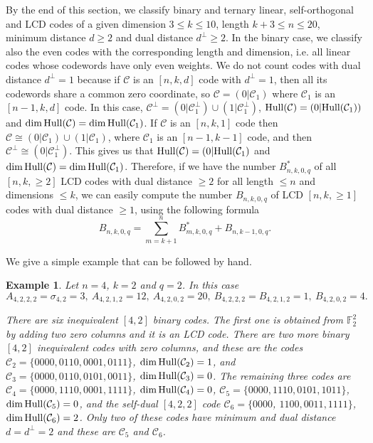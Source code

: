 \documentclass[a4paper,11pt]{article}
\newtheorem{example}{Example}
\newcommand{\F}{\mathbb{F}}
\newcommand{\hull}{\mbox{\rm Hull}}
\begin{document}
By the end of this section, we classify binary and ternary linear, self-orthogonal and LCD codes of a given dimension $3\le k\le 10$, length $k+3\le n\le 20$, minimum distance $d\ge 2$ and dual distance $d^\perp\ge 2$.
 In the binary case, we classify also the even codes with the corresponding length and dimension, i.e. all linear codes whose codewords have only even weights. We do not count codes with dual distance $d^\perp=1$ because if $\mathcal{C}$ is an $[n,k,d]$ code with $d^\perp=1$, then all its codewords share a common zero coordinate, so $\mathcal{C}=(0|\mathcal{C}_1)$ where $\mathcal{C}_1$ is an $[n-1,k,d]$ code. In this case, $\mathcal{C}^\perp=(0|\mathcal{C}_1^\perp)\cup (1|\mathcal{C}_1^\perp)$, $\hull(\mathcal{C})=(0|\hull(\mathcal{C}_1))$ and $\dim \hull(\mathcal{C})=\dim\hull(\mathcal{C}_1)$.
  If $\mathcal{C}$ is an $[n,k,1]$ code then $\mathcal{C}\cong (0|\mathcal{C}_1)\cup (1|\mathcal{C}_1)$, where $\mathcal{C}_1$ is an $[n-1,k-1]$ code, and then $\mathcal{C}^\perp\cong (0|\mathcal{C}_1^\perp)$. This gives us that $\hull(\mathcal{C})=(0|\hull(\mathcal{C}_1)$ and $\dim \hull(\mathcal{C})=\dim\hull(\mathcal{C}_1)$.
  Therefore, if we have the number $B_{n,k,0,q}^*$ of all $[n,k,\ge 2]$ LCD codes with dual distance $\ge 2$ for all length $\le n$ and dimensions $\le k$, we can easily compute the number $B_{n,k,0,q}$ of LCD $[n,k,\ge 1]$ codes with dual distance $\ge 1$, using the following formula
$$B_{n,k,0,q}=\sum_{m=k+1}^{n}B_{m,k,0,q}^*+B_{n,k-1,0,q}.$$

We give a simple example that can be followed by hand.

\begin{example}\rm Let $n=4$, $k=2$ and $q=2$. In this case
$$A_{4,2,2,2}=\sigma_{4,2}=3, \ A_{4,2,1,2}=12, \ A_{4,2,0,2}=20, \
B_{4,2,2,2}=B_{4,2,1,2}=1, \ B_{4,2,0,2}=4.$$

There are six inequivalent $[4,2]$ binary codes. The first one is obtained from $\F_2^2$ by adding two zero columns and it is an LCD code. There are two more binary $[4,2]$ inequivalent codes with zero columns, and these are the codes $\mathcal{C}_2=\{0000,0110,0001,0111\}$, $\dim \hull(\mathcal{C}_2)=1$, and $\mathcal{C}_3=\{0000,0110,0101,0011\}$, $\dim \hull(\mathcal{C}_3)=0$. The remaining three codes are $\mathcal{C}_4=\{0000,1110,0001,1111\}$, $\dim \hull(\mathcal{C}_4)=0$, $\mathcal{C}_5=\{0000,1110,0101,1011\}$, $\dim \hull(\mathcal{C}_5)=0$, and the self-dual $[4,2,2]$ code $\mathcal{C}_6=\{0000$, $1100,0011,1111\}$, $\dim \hull(\mathcal{C}_6)=2$. Only two of these codes have minimum and dual distance $d=d^\perp=2$ and these are $\mathcal{C}_5$ and $\mathcal{C}_6$.
\end{example}
\end{document}
